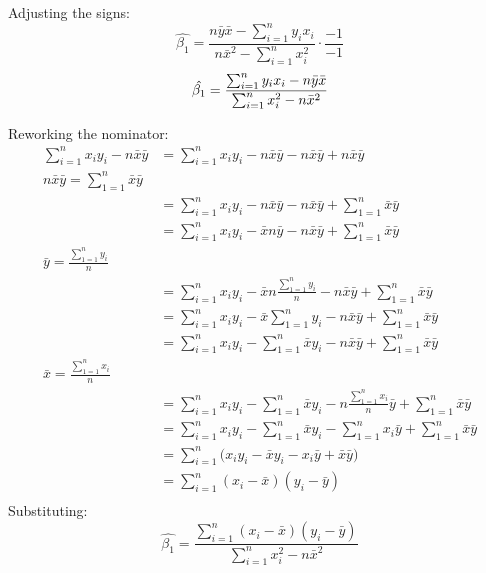 \documentclass{article}
\begin{document}
Adjusting the signs:
$$
\hat{\beta_1} =  \frac{n\bar{y}\bar{x} 
- \sum_{i=1}^{n}y_i x_i}{n\bar{x}^2 - \sum_{i=1}^{n}x_i^2} \cdot \frac{-1}{-1 } 
$$
\begin{equation}
\hat{\beta_1} =  \frac{\sum_{i=1}^{n}y_i x_i - n\bar{y}\bar{x}}{\sum_{i=1}^{n}x_i^2 - n\bar{x}^2} \\ \label{eq:2}
\end{equation}


Reworking the nominator:
\begin{align*}
\sum_{i=1}^{n}  x_i y_i - n\bar{x}\bar{y} & = \sum_{i=1}^{n}x_i y_i - n\bar{x}\bar{y} - n\bar{x}\bar{y} + n\bar{x}\bar{y} \\ %
n\bar{x}\bar{y} = \sum_{1=1}^{n}\bar{x}\bar{y} \\ %
& = \sum_{i=1}^{n}x_i y_i - n\bar{x}\bar{y} - n\bar{x}\bar{y} + \sum_{1=1}^{n}\bar{x}\bar{y} \\ %
& = \sum_{i=1}^{n}x_i y_i - \bar{x}n\bar{y} - n\bar{x}\bar{y} + \sum_{1=1}^{n}\bar{x}\bar{y} \\ %
 \bar{y} = \frac{\sum_{1=1}^{n}y_i}{n} \\ %
& = \sum_{i=1}^{n}x_i y_i - \bar{x}n\frac{\sum_{1=1}^{n}y_i}{n} - n\bar{x}\bar{y} + \sum_{1=1}^{n}\bar{x}\bar{y} \\ %
& = \sum_{i=1}^{n}x_i y_i - \bar{x}\sum_{1=1}^{n}y_i - n\bar{x}\bar{y} + \sum_{1=1}^{n}\bar{x}\bar{y} \\ %
& = \sum_{i=1}^{n}x_i y_i - \sum_{1=1}^{n}\bar{x}y_i - n\bar{x}\bar{y} + \sum_{1=1}^{n}\bar{x}\bar{y} \\ %
 \bar{x} = \frac{\sum_{1=1}^{n}x_i}{n} \\ %
& = \sum_{i=1}^{n}x_i y_i - \sum_{1=1}^{n}\bar{x}y_i - n\frac{\sum_{1=1}^{n}x_i}{n}\bar{y} + \sum_{1=1}^{n}\bar{x}\bar{y} \\ %
& = \sum_{i=1}^{n}x_i y_i - \sum_{1=1}^{n}\bar{x}y_i - \sum_{1=1}^{n}x_i\bar{y} + \sum_{1=1}^{n}\bar{x}\bar{y} \\ %
& = \sum_{i=1}^{n}\big(x_i y_i - \bar{x}y_i - x_i \bar{y} + \bar{x}\bar{y}\big) \\ %
& = \sum_{i=1}^{n}(x_i - \bar{x})(y_i - \bar{y}) \\
\end{align*}
Substituting:
$$
\hat{\beta_1}=  \frac{\sum_{i=1}^{n}(x_i - \bar{x})(y_i - \bar{y})}{\sum_{i=1}^{n}x_i^2 - n\bar{x}^2}
$$
\end{document}
